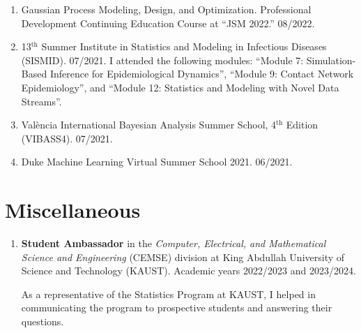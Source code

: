 \documentclass[10pt, ]{article}
\begin{document}
\begin{enumerate}[noitemsep, topsep=0pt]
		\item Gaussian Process Modeling, Design, and Optimization. Professional Development Continuing Education Course at ``JSM 2022.'' 08/2022.
		
		\item 13${}^{\text{th}}$ Summer Institute in Statistics and Modeling in Infectious Diseases (SISMID). 07/2021. I attended the following modules: ``Module 7: Simulation-Based Inference for Epidemiological Dynamics'', ``Module 9: Contact Network Epidemiology'', and ``Module 12: Statistics and Modeling with Novel Data Streams''.
		
		\item València International Bayesian Analysis Summer School, 4${}^{\text{th}}$ Edition (VIBASS4). 07/2021.
		
		\item Duke Machine Learning Virtual Summer School 2021. 06/2021.
	\end{enumerate}
	
	\vspace{10pt}

	\vspace{-12pt}
	\section*{Miscellaneous} \vspace{-5pt}
	
	\begin{enumerate}[noitemsep, topsep=0pt]
		\item \textbf{Student Ambassador} in the\textit{ Computer, Electrical,  and Mathematical Science and Engineering} (CEMSE) division at King Abdullah University of Science and Technology (KAUST). Academic years 2022/2023 and 2023/2024.
		
		As a representative of the Statistics Program at KAUST, I helped in communicating the program to prospective students and answering their questions.
	\end{enumerate}
	
\end{document}
